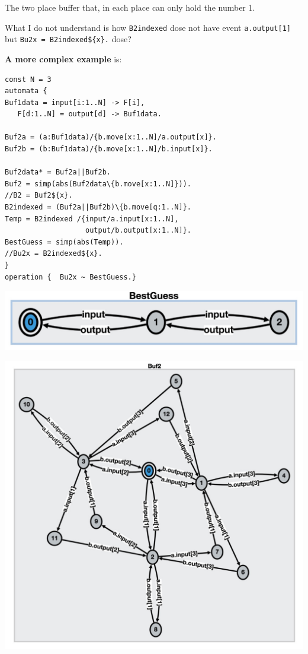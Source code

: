 \documentclass[]{article}
\begin{document}
{The two place buffer that, in each place can only hold the number 1. 

What I do not understand is how \verb|B2indexed| dose not have event  \verb|a.output[1]| but  
\verb|Bu2x = B2indexed${x}.| dose?



{\bf A more complex example} is:

\begin{minipage}{0.55\textwidth}
\begin{verbatim}
const N = 3
automata {
Buf1data = input[i:1..N] -> F[i],
   F[d:1..N] = output[d] -> Buf1data.
 
Buf2a = (a:Buf1data)/{b.move[x:1..N]/a.output[x]}.
Buf2b = (b:Buf1data)/{b.move[x:1..N]/b.input[x]}.

Buf2data* = Buf2a||Buf2b.
Buf2 = simp(abs(Buf2data\{b.move[x:1..N]})).
//B2 = Buf2${x}.
B2indexed = (Buf2a||Buf2b)\{b.move[q:1..N]}.
Temp = B2indexed /{input/a.input[x:1..N], 
                   output/b.output[x:1..N]}.
BestGuess = simp(abs(Temp)).
//Bu2x = B2indexed${x}.
}
operation {  Bu2x ~ BestGuess.}
   \end{verbatim} 
\end{minipage}\begin{minipage}{0.4\textwidth}
\begin{center}\includegraphics[scale=0.15]{BestGuess.jpg}

\includegraphics[scale=0.17]{HideBuf2.jpg}\end{center}
\end{minipage}

}
\end{document}

